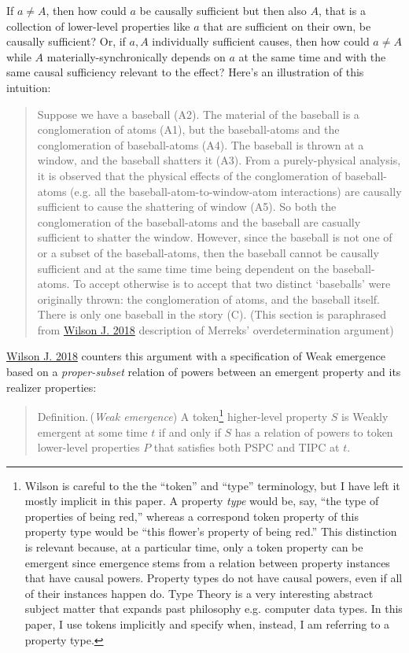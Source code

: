 \documentclass{article}
\newcommand{\ti}[1]{\textit{#1}}
\newcommand{\definition}{{\sc Definition.}\,}
\renewcommand{\cite}[1]{\hyperlink{#1}{#1}}
\begin{document}
If $a \neq A$, then how could $a$ be causally sufficient but then also $A$, that is a collection of lower-level properties like $a$ that are sufficient on their own, be causally sufficient? Or, if $a, A$ individually sufficient causes, then how could $a \neq A$ while $A$ materially-synchronically depends on $a$ at the same time and with the same causal sufficiency relevant to the effect? Here's an illustration of this intuition:

\begin{quote}
    Suppose we have a baseball (A2). The material of the baseball is a conglomeration of atoms (A1), but the baseball-atoms and the conglomeration of baseball-atoms (A4). The baseball is thrown at a window, and the baseball shatters it (A3). From a purely-physical analysis, it is observed that the physical effects of the conglomeration of baseball-atoms (e.g. all the baseball-atom-to-window-atom interactions) are causally sufficient to cause the shattering of window (A5). So both the conglomeration of the baseball-atoms and the baseball are casually sufficient to shatter the window. However, since the baseball is not one of or a subset of the baseball-atoms, then the baseball cannot be causally sufficient and at the same time time being dependent on the baseball-atoms. To accept otherwise is to accept that two distinct `baseballs' were originally thrown: the conglomeration of atoms, and the baseball itself. There is only one baseball in the story (C). (This section is paraphrased from \cite{Wilson J. 2018} description of Merreks' overdetermination argument)
\end{quote}

\cite{Wilson J. 2018} counters this argument with a specification of Weak emergence based on a \ti{proper-subset} relation of powers between an emergent property and its realizer properties:

\begin{quote}
\definition (\ti{Weak emergence}) A token\footnote{Wilson is careful to the the ``token'' and ``type'' terminology, but I have left it mostly implicit in this paper. A property \ti{type} would be, say, ``the type of properties of being red,'' whereas a correspond token property of this property type would be ``this flower's property of being red.'' This distinction is relevant because, at a particular time, only a token property can be emergent since emergence stems from a relation between property instances that have causal powers. Property types do not have causal powers, even if all of their instances happen do. Type Theory is a very interesting abstract subject matter that expands past philosophy e.g. computer data types. In this paper, I use tokens implicitly and specify when, instead, I am referring to a property type.} higher-level property $S$ is Weakly emergent at some time $t$ if and only if $S$ has a relation of powers to token lower-level properties $P$ that satisfies both PSPC and TIPC at $t$.
\end{quote}
\end{document}
